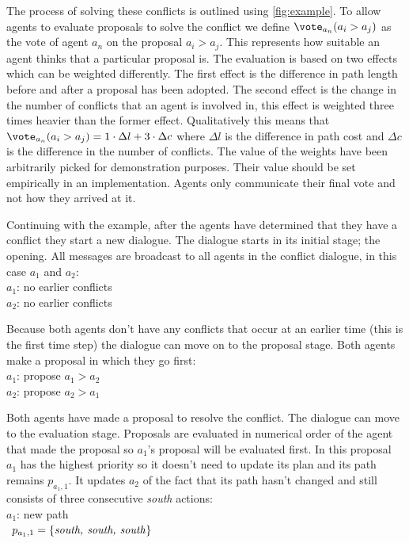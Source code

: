 The process of solving these conflicts is outlined using \autoref{fig:example}. 
To allow agents to evaluate 
proposals to solve the conflict we define $\vote_{a_n}(a_i > a_j)$ as 
the vote of agent $a_n$ on the proposal $a_i > a_j$. This represents how 
suitable an agent thinks that a particular proposal is. The evaluation  is 
based on two effects which can be weighted
differently. The first effect is the difference in path length before and after
a proposal has been adopted. The second effect is the change in the number of
conflicts that an agent is involved in, this effect is weighted three times
heavier than the former effect. Qualitatively this means that $\vote_{a_n}(a_i
> a_j) = 1 \cdot \Delta l + 3 \cdot \Delta c$ where $\Delta l$ is the
difference in path cost and $\Delta c$ is the difference in the number of 
conflicts. The 
value of the weights have been arbitrarily picked for demonstration purposes. 
Their value should be set empirically in an implementation.
Agents only communicate their final vote and not how they arrived at it.

Continuing with the example, after the agents have determined that they have a
conflict they start a new dialogue. The dialogue starts in its initial stage;
the opening. All messages are broadcast to all agents in the conflict dialogue,
in this case $a_1$ and $a_2$:
\\ \-\qquad $a_1$: no earlier conflicts
\\ \-\qquad $a_2$: no earlier conflicts

\noindent Because both agents don't have any conflicts that occur at an earlier 
time
(this is the first time step) the dialogue can move on to the proposal stage.
Both agents make a proposal in which they go first:
\\ \-\qquad $a_1$: propose $a_1 > a_2$
\\ \-\qquad $a_2$: propose $a_2 > a_1$

\noindent Both agents have made a proposal to resolve the conflict. The 
dialogue can
move to the evaluation stage. Proposals are evaluated in numerical order of the 
agent that made the proposal so $a_1$'s proposal will be evaluated first. In 
this proposal $a_1$ has the highest priority so it doesn't need to update its 
plan and its path remains $p_{a_1,1}$. It updates $a_2$ of the fact that its 
path hasn't changed and still consists of three consecutive \emph{south} 
actions:
\\ \-\qquad $a_1$: new path
\\ \-\qquad\quad\,\; $p_{a_1,1} = \{\text{\emph{south, south, south}}\}$

